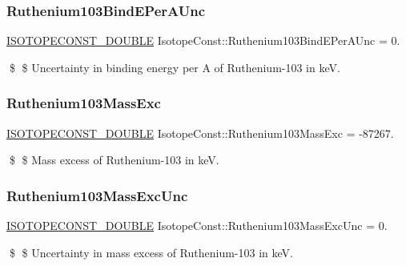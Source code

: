 \subsubsection{\texorpdfstring{Ruthenium103\+Bind\+E\+Per\+A\+Unc}{Ruthenium103BindEPerAUnc}}
{\footnotesize\ttfamily \mbox{\hyperlink{group___isotope_const-_macros_ga8f45a7272ce02c0b4c65c44636ed719a}{I\+S\+O\+T\+O\+P\+E\+C\+O\+N\+S\+T\+\_\+\+D\+O\+U\+B\+LE}} Isotope\+Const\+::\+Ruthenium103\+Bind\+E\+Per\+A\+Unc = 0.}

\$ \$ Uncertainty in binding energy per A of Ruthenium-\/103 in keV. \mbox{\label{group___isotope_const-_ruthenium-_ru103_ga6d475b5025af0dd1efda96cb15260794}} 
\subsubsection{\texorpdfstring{Ruthenium103\+Mass\+Exc}{Ruthenium103MassExc}}
{\footnotesize\ttfamily \mbox{\hyperlink{group___isotope_const-_macros_ga8f45a7272ce02c0b4c65c44636ed719a}{I\+S\+O\+T\+O\+P\+E\+C\+O\+N\+S\+T\+\_\+\+D\+O\+U\+B\+LE}} Isotope\+Const\+::\+Ruthenium103\+Mass\+Exc = -\/87267.}

\$ \$ Mass excess of Ruthenium-\/103 in keV. \mbox{\label{group___isotope_const-_ruthenium-_ru103_ga79d59e641ffb2ad1a9a6390b1d3e69f6}} 
\subsubsection{\texorpdfstring{Ruthenium103\+Mass\+Exc\+Unc}{Ruthenium103MassExcUnc}}
{\footnotesize\ttfamily \mbox{\hyperlink{group___isotope_const-_macros_ga8f45a7272ce02c0b4c65c44636ed719a}{I\+S\+O\+T\+O\+P\+E\+C\+O\+N\+S\+T\+\_\+\+D\+O\+U\+B\+LE}} Isotope\+Const\+::\+Ruthenium103\+Mass\+Exc\+Unc = 0.}

\$ \$ Uncertainty in mass excess of Ruthenium-\/103 in keV. \mbox{\label{group___isotope_const-_ruthenium-_ru103_ga1e7618ed67f252e86db90f210a70c5ed}} 

